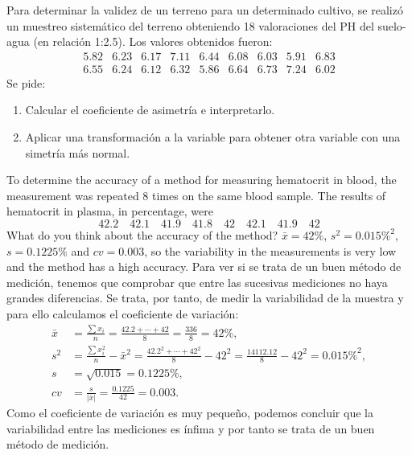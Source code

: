 {Para determinar la validez de un terreno para un determinado cultivo, se realizó un muestreo sistemático del terreno obteniendo 18 valoraciones del PH del suelo-agua (en relación 1:2.5).
Los valores obtenidos fueron:
\[
\begin{array}{ccccccccc}
5.82 & 6.23 & 6.17 & 7.11 & 6.44 & 6.08 & 6.03 & 5.91 & 6.83 \\
6.55 & 6.24 & 6.12 & 6.32 & 5.86 & 6.64 & 6.73 & 7.24 & 6.02
\end{array}
\]
Se pide:
\begin{enumerate}
\item Calcular el coeficiente de asimetría e interpretarlo.
\item Aplicar una transformación a la variable para obtener otra variable con una simetría más normal.
\end{enumerate}
}


{To determine the accuracy of a method for measuring hematocrit in blood, the measurement was repeated 8 times on
the same blood sample.
The results of hematocrit in plasma, in percentage, were
\[
42.2\quad 42.1\quad 41.9\quad 41.8\quad 42\quad 42.1\quad 41.9\quad 42
\]
What do you think about the accuracy of the method?
}
{$\bar x= 42\%$, $s^2=0.015\%^2$, $s=0.1225\%$ and $cv=0.003$, so the variability in the measurements is very low and the method has a high accuracy.
}
{Para ver si se trata de un buen método de medición, tenemos que comprobar que entre las sucesivas mediciones no haya grandes diferencias. Se trata, por tanto, de medir la variabilidad de la muestra y para ello calculamos el coeficiente de variación:
\begin{align*}
\bar x & = \frac{\sum x_i}{n} = \frac{42.2+\cdots+42}{8} = \frac{336}{8}= 42\%,\\
s^2 & = \frac{\sum x_i^2}{n}-\bar x^2 = \frac{42.2^2+\cdots+42^2}{8}-42^2 = \frac{14112.12}{8}-42^2= 0.015\%^2,\\
s &= \sqrt{0.015} = 0.1225\%,\\
cv &= \frac{s}{|\bar x|} = \frac{0.1225}{42} = 0.003.
\end{align*}
Como el coeficiente de variación es muy pequeño, podemos concluir que la variabilidad entre las mediciones es ínfima y por tanto se trata de un buen método de medición.
}


